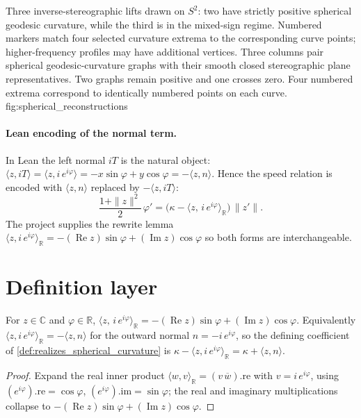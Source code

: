   {Three inverse-stereographic lifts drawn on $S^2$: two have strictly positive
   spherical geodesic curvature, while the third is in the mixed-sign regime.
   Numbered markers match four selected curvature extrema to the corresponding
   curve points; higher-frequency profiles may have additional vertices.}
  {Three columns pair spherical geodesic-curvature graphs with their smooth
   closed stereographic plane representatives. Two graphs remain positive and
   one crosses zero. Four numbered extrema correspond to identically numbered
   points on each curve.}
  {fig:spherical_reconstructions}

\paragraph{Lean encoding of the normal term.}
In Lean the left normal $iT$ is the natural object: $\langle z,iT\rangle=\langle z,
i\,e^{i\varphi}\rangle=-x\sin\varphi+y\cos\varphi=-\langle z,n\rangle$. Hence the speed
relation is encoded with $\langle z,n\rangle$ replaced by $-\langle z,iT\rangle$:
\[
  \frac{1+\|z\|^2}{2}\,\varphi'
    =\bigl(\kappa-\langle z,\, i\,e^{i\varphi}\rangle_{\mathbb R}\bigr)\,\|z'\| .
\]
The project supplies the rewrite lemma
$\langle z, i\,e^{i\varphi}\rangle_{\mathbb R}=-(\operatorname{Re}z)\sin\varphi
+(\operatorname{Im}z)\cos\varphi$ so both forms are interchangeable.

\section{Definition layer}
\label{sec:sphere_defs}

\begin{lemma}
  \label{lem:sphere_normal_inner_eq}
  For $z\in\mathbb C$ and $\varphi\in\mathbb R$,
  $\langle z,\, i\,e^{i\varphi}\rangle_{\mathbb R}
   =-(\operatorname{Re}z)\sin\varphi+(\operatorname{Im}z)\cos\varphi$.
  Equivalently $\langle z, i\,e^{i\varphi}\rangle_{\mathbb R}=-\langle z,n\rangle$ for the
  outward normal $n=-i\,e^{i\varphi}$, so the defining coefficient of
  \cref{def:realizes_spherical_curvature} is
  $\kappa-\langle z,i\,e^{i\varphi}\rangle_{\mathbb R}=\kappa+\langle z,n\rangle$.
\end{lemma}

\begin{proof}

\leanok
  Expand the real inner product $\langle w,v\rangle_{\mathbb R}=(v\,\overline w).\mathrm{re}$
  with $v=i\,e^{i\varphi}$, using
  $(e^{i\varphi}).\mathrm{re}=\cos\varphi$, $(e^{i\varphi}).\mathrm{im}=\sin\varphi$; the
  real and imaginary multiplications collapse to
  $-(\operatorname{Re}z)\sin\varphi+(\operatorname{Im}z)\cos\varphi$.
\end{proof}

